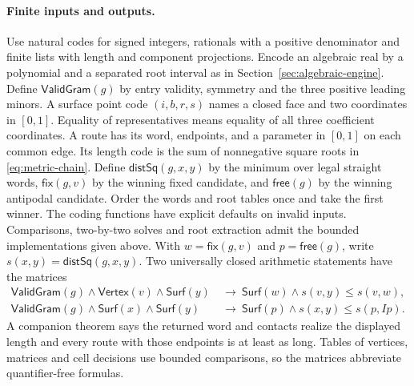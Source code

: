 \documentclass[10pt,letterpaper]{article}
\begin{document}
\paragraph{Finite inputs and outputs.}
Use natural codes for signed integers, rationals with a positive
denominator and finite lists with length and component projections.
Encode an algebraic real by a polynomial and a separated root
interval as in Section~\ref{sec:algebraic-engine}.
Define $\mathsf{ValidGram}(g)$ by entry validity, symmetry and the
three positive leading minors. A surface point code $(i,b,r,s)$
names a closed face and two coordinates in $[0,1]$. Equality of
representatives means equality of all three coefficient coordinates.
A route has its word, endpoints, and a parameter in $[0,1]$ on each
common edge. Its length code is the sum of nonnegative square roots
in \eqref{eq:metric-chain}. Define $\mathsf{distSq}(g,x,y)$ by the
minimum over legal straight words,
$\mathsf{fix}(g,v)$ by the winning fixed candidate, and
$\mathsf{free}(g)$ by the winning antipodal candidate. Order the
words and root tables once and take the first winner. The coding
functions have explicit defaults on invalid inputs. Comparisons,
two-by-two solves and root extraction admit the bounded implementations
given above. With $w=\mathsf{fix}(g,v)$ and $p=\mathsf{free}(g)$,
write $s(x,y)=\mathsf{distSq}(g,x,y)$. Two universally closed
arithmetic statements have the matrices
\begin{align*}
 \mathsf{ValidGram}(g)\land\mathsf{Vertex}(v)\land\mathsf{Surf}(y)
 &\ \to\ \mathsf{Surf}(w)\land s(v,y)\le s(v,w),\\
 \mathsf{ValidGram}(g)\land\mathsf{Surf}(x)\land\mathsf{Surf}(y)
 &\ \to\ \mathsf{Surf}(p)\land s(x,y)\le s(p,Ip).
\end{align*}
A companion theorem says the returned word and contacts realize the
displayed length and every route with those endpoints is at least as
long. Tables of vertices, matrices and cell decisions use bounded
comparisons, so the matrices abbreviate quantifier-free formulas.
\end{document}
